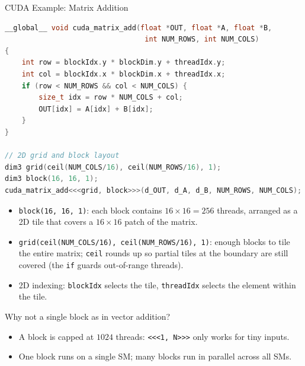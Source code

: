 \begin{frame}[fragile]{CUDA Example: Matrix Addition}

\begin{lstlisting}[language=C++, keywordstyle=\color{fablue}\bfseries]
__global__ void cuda_matrix_add(float *OUT, float *A, float *B,
                                 int NUM_ROWS, int NUM_COLS)
{
    int row = blockIdx.y * blockDim.y + threadIdx.y;
    int col = blockIdx.x * blockDim.x + threadIdx.x;
    if (row < NUM_ROWS && col < NUM_COLS) {
        size_t idx = row * NUM_COLS + col;
        OUT[idx] = A[idx] + B[idx];
    }
}

// 2D grid and block layout
dim3 grid(ceil(NUM_COLS/16), ceil(NUM_ROWS/16), 1);
dim3 block(16, 16, 1);
cuda_matrix_add<<<grid, block>>>(d_OUT, d_A, d_B, NUM_ROWS, NUM_COLS);
\end{lstlisting}

  \vspace{0.3em}
  {\scriptsize
  \begin{itemize}
    \item \texttt{block(16, 16, 1)}: each block contains $16 \times 16 = 256$ threads, arranged as a 2D tile that covers a $16 \times 16$ patch of the matrix.
    \item \texttt{grid(ceil(NUM\_COLS/16), ceil(NUM\_ROWS/16), 1)}: enough blocks to tile the entire matrix; \texttt{ceil} rounds up so partial tiles at the boundary are still covered (the \texttt{if} guards out-of-range threads).
    \item 2D indexing: \texttt{blockIdx} selects the tile, \texttt{threadIdx} selects the element within the tile.
  \end{itemize}
  }

  \vspace{0.3em}
  {\scriptsize
  \begin{block}{Why not a single block as in vector addition?}
    \begin{itemize}
      \item A block is capped at $1024$ threads: \texttt{<{}<{}<1, N>{}>{}>} only works for tiny inputs.
      \item One block runs on a single SM; many blocks run in parallel across all SMs.
    \end{itemize}
  \end{block}
  }
\end{frame}

